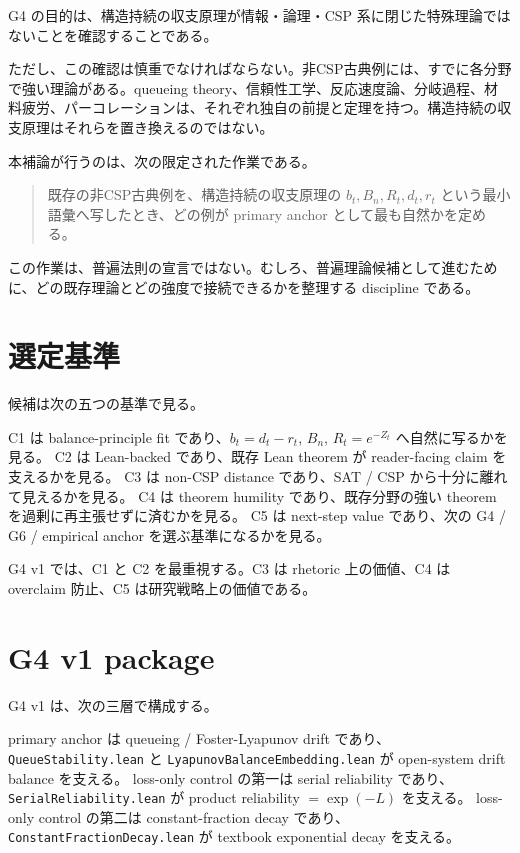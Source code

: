 \documentclass[12pt,a4paper]{article}
\begin{document}
G4 の目的は、構造持続の収支原理が情報・論理・CSP 系に閉じた特殊理論ではないことを確認することである。

ただし、この確認は慎重でなければならない。非CSP古典例には、すでに各分野で強い理論がある。queueing theory、信頼性工学、反応速度論、分岐過程、材料疲労、パーコレーションは、それぞれ独自の前提と定理を持つ。構造持続の収支原理はそれらを置き換えるのではない。

本補論が行うのは、次の限定された作業である。

\begin{quote}
既存の非CSP古典例を、構造持続の収支原理の $b_{t},B_{n},R_{t},d_{t},r_{t}$ という最小語彙へ写したとき、どの例が primary anchor として最も自然かを定める。
\end{quote}

この作業は、普遍法則の宣言ではない。むしろ、普遍理論候補として進むために、どの既存理論とどの強度で接続できるかを整理する discipline である。

\section{選定基準}\label{ux9078ux5b9aux57faux6e96}

候補は次の五つの基準で見る。

C1 は balance-principle fit であり、\(b_{t}=d_{t}-r_{t}\), \(B_{n}\), \(R_{t}=e^{-Z_{t}}\) へ自然に写るかを見る。 C2 は Lean-backed であり、既存 Lean theorem が reader-facing claim を支えるかを見る。 C3 は non-CSP distance であり、SAT / CSP から十分に離れて見えるかを見る。 C4 は theorem humility であり、既存分野の強い theorem を過剰に再主張せずに済むかを見る。 C5 は next-step value であり、次の G4 / G6 / empirical anchor を選ぶ基準になるかを見る。

G4 v1 では、C1 と C2 を最重視する。C3 は rhetoric 上の価値、C4 は overclaim 防止、C5 は研究戦略上の価値である。

\section{G4 v1 package}\label{g4-v1-package}

G4 v1 は、次の三層で構成する。

primary anchor は queueing / Foster-Lyapunov drift であり、\texttt{QueueStability.lean} と \texttt{LyapunovBalanceEmbedding.lean} が open-system drift balance を支える。 loss-only control の第一は serial reliability であり、\texttt{SerialReliability.lean} が product reliability \(=\exp(-L)\) を支える。 loss-only control の第二は constant-fraction decay であり、 \texttt{ConstantFractionDecay.lean} が textbook exponential decay を支える。
\end{document}
